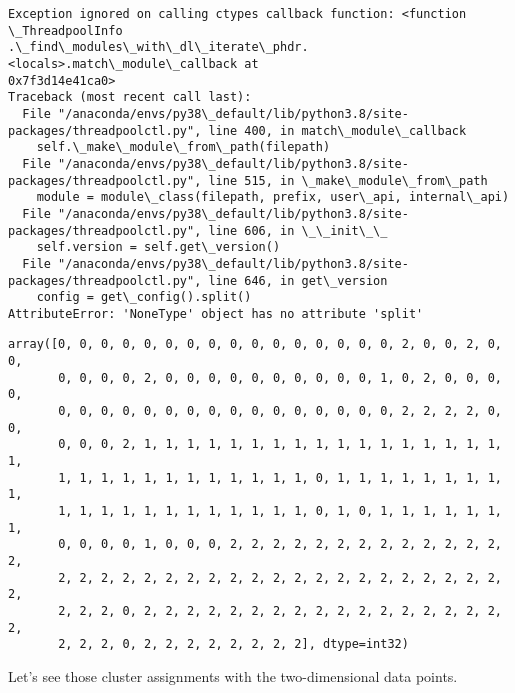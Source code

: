 \documentclass[11pt]{article}
\makeatletter
\newcommand{\boxspacing}{\kern\kvtcb@left@rule\kern\kvtcb@boxsep}
\newcommand{\prompt}[4]{
        {\ttfamily\llap{{\color{#2}[#3]:\hspace{3pt}#4}}\vspace{-\baselineskip}}
    }
\makeatother
\begin{document}
\begin{Verbatim}[commandchars=\\\{\}]
Exception ignored on calling ctypes callback function: <function \_ThreadpoolInfo
.\_find\_modules\_with\_dl\_iterate\_phdr.<locals>.match\_module\_callback at
0x7f3d14e41ca0>
Traceback (most recent call last):
  File "/anaconda/envs/py38\_default/lib/python3.8/site-
packages/threadpoolctl.py", line 400, in match\_module\_callback
    self.\_make\_module\_from\_path(filepath)
  File "/anaconda/envs/py38\_default/lib/python3.8/site-
packages/threadpoolctl.py", line 515, in \_make\_module\_from\_path
    module = module\_class(filepath, prefix, user\_api, internal\_api)
  File "/anaconda/envs/py38\_default/lib/python3.8/site-
packages/threadpoolctl.py", line 606, in \_\_init\_\_
    self.version = self.get\_version()
  File "/anaconda/envs/py38\_default/lib/python3.8/site-
packages/threadpoolctl.py", line 646, in get\_version
    config = get\_config().split()
AttributeError: 'NoneType' object has no attribute 'split'
    \end{Verbatim}

            \begin{tcolorbox}[breakable, size=fbox, boxrule=.5pt, pad at break*=1mm, opacityfill=0]
\prompt{Out}{outcolor}{2}{\boxspacing}
\begin{Verbatim}[commandchars=\\\{\}]
array([0, 0, 0, 0, 0, 0, 0, 0, 0, 0, 0, 0, 0, 0, 0, 0, 2, 0, 0, 2, 0, 0,
       0, 0, 0, 0, 2, 0, 0, 0, 0, 0, 0, 0, 0, 0, 0, 1, 0, 2, 0, 0, 0, 0,
       0, 0, 0, 0, 0, 0, 0, 0, 0, 0, 0, 0, 0, 0, 0, 0, 2, 2, 2, 2, 0, 0,
       0, 0, 0, 2, 1, 1, 1, 1, 1, 1, 1, 1, 1, 1, 1, 1, 1, 1, 1, 1, 1, 1,
       1, 1, 1, 1, 1, 1, 1, 1, 1, 1, 1, 1, 0, 1, 1, 1, 1, 1, 1, 1, 1, 1,
       1, 1, 1, 1, 1, 1, 1, 1, 1, 1, 1, 1, 0, 1, 0, 1, 1, 1, 1, 1, 1, 1,
       0, 0, 0, 0, 1, 0, 0, 0, 2, 2, 2, 2, 2, 2, 2, 2, 2, 2, 2, 2, 2, 2,
       2, 2, 2, 2, 2, 2, 2, 2, 2, 2, 2, 2, 2, 2, 2, 2, 2, 2, 2, 2, 2, 2,
       2, 2, 2, 0, 2, 2, 2, 2, 2, 2, 2, 2, 2, 2, 2, 2, 2, 2, 2, 2, 2, 2,
       2, 2, 2, 0, 2, 2, 2, 2, 2, 2, 2, 2], dtype=int32)
\end{Verbatim}
\end{tcolorbox}
        
    Let's see those cluster assignments with the two-dimensional data
points.
\end{document}
